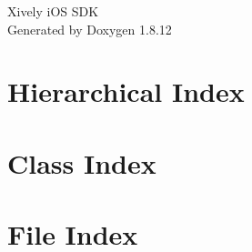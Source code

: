 \documentclass[twoside]{book}
\newcommand{\+}{\discretionary{\mbox{\scriptsize$\hookleftarrow$}}{}{}}
\newcommand{\clearemptydoublepage}{%
  \newpage{\pagestyle{empty}\cleardoublepage}%
}
\begin{document}
\hypersetup{pageanchor=false,
             bookmarksnumbered=true,
             pdfencoding=unicode
            }
\begin{titlepage}
\vspace*{7cm}
\begin{center}%
{\Large Xively i\+OS S\+DK }\\
\vspace*{1cm}
{\large Generated by Doxygen 1.8.12}\\
\end{center}
\end{titlepage}
\clearemptydoublepage
{}
\tableofcontents
\clearemptydoublepage
{}
\hypersetup{pageanchor=true}

\chapter{Hierarchical Index}

\chapter{Class Index}

\chapter{File Index}

\end{document}
